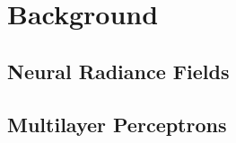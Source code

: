 %
\chapter{Background}
\label{sec:background}

\section{Neural Radiance Fields}
\label{sec:background:nerf}

\section{Multilayer Perceptrons}
\label{sec:background:mlp}
